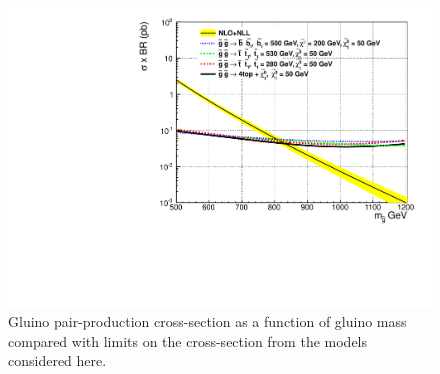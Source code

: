 


\begin{figure}[htb]
\begin{center}
\includegraphics[width=0.48\linewidth]{figs/gluino1dsum.pdf}
\caption{Gluino pair-production cross-section
as a function of gluino mass compared with limits
on the cross-section from the models considered here.
\label{fig:gluinoLimit1d}}
\end{center}
\end{figure}











\clearpage
